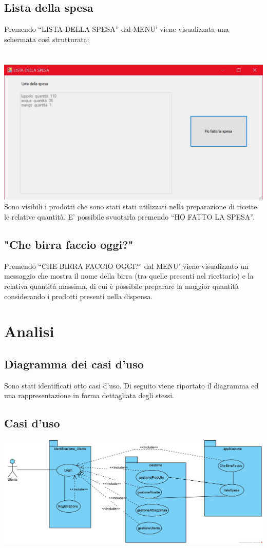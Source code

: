\documentclass[a4paper, titlepage]{article}
\begin{document}
\subsection{Lista della spesa}
Premendo “LISTA DELLA SPESA” dal MENU’ viene visualizzata una schermata così strutturata:\\\\\
\includegraphics[scale=0.30]{Immagini/form/Form ListaSpesa.jpg}
\\Sono visibili i prodotti che sono stati stati utilizzati nella preparazione di ricette le relative quantità. E’ possibile svuotarla premendo “HO FATTO LA SPESA”.
\subsection{"Che birra faccio oggi?"}
Premendo “CHE BIRRA FACCIO OGGI?” dal MENU’ viene visualizzato un messaggio che mostra il nome della birra (tra quelle presenti nel ricettario)  e la relativa quantità massima, di cui è possibile preparare la maggior quantità considerando i prodotti presenti nella dispensa.

\newpage
\section{Analisi}
\subsection{Diagramma dei casi d'uso}
Sono stati identificati otto casi d’uso. Di seguito viene riportato il diagramma ed una rappresentazione in forma dettagliata degli stessi.
\vphantom{}
\subsection{Casi d'uso}
\vphantom{}
\includegraphics[scale=0.65]{Immagini/Use Case Diagram_Brew Day!.png}
\vphantom{}
\end{document}

